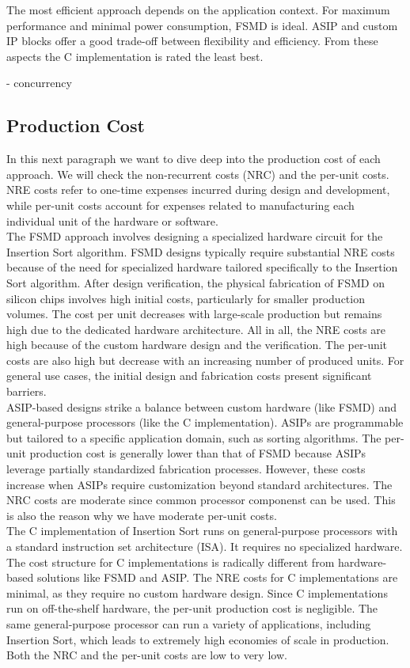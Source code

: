 \documentclass[conference]{IEEEtran}
\begin{document}
The most efficient approach depends on the application context. For maximum performance and minimal power consumption, FSMD is ideal. ASIP and custom IP blocks offer a good trade-off between flexibility and efficiency. From these aspects the C implementation is rated the least best.

- concurrency 


\subsection{Production Cost}
In this next paragraph we want to dive deep into the production cost of each approach. We will check the non-recurrent costs (NRC) and the per-unit costs. NRE costs refer to one-time expenses incurred during design and development, while per-unit costs account for expenses related to manufacturing each individual unit of the hardware or software.\\
The FSMD approach involves designing a specialized hardware circuit for the Insertion Sort algorithm. FSMD designs typically require substantial NRE costs because of the need for specialized
hardware tailored specifically to the Insertion Sort algorithm. After design verification, the physical fabrication of FSMD on silicon chips involves high initial costs, particularly for smaller production volumes. The cost per unit decreases with large-scale production but remains high due to the dedicated hardware architecture. All in all, the NRE costs are high because of the custom hardware design and the verification. The per-unit costs are also high but decrease with an increasing number of produced units. For general use cases, the initial design and fabrication costs present significant barriers.\\
ASIP-based designs strike a balance between custom hardware (like FSMD) and general-purpose processors (like the C implementation). ASIPs are programmable but tailored to a specific application domain, such as sorting algorithms. The per-unit production cost is generally lower than that of FSMD because ASIPs leverage partially standardized fabrication processes. However, these costs increase when ASIPs require customization beyond standard architectures. 
The NRC costs are moderate since common processor componenst can be used. This is also the reason why we have moderate per-unit costs.\\
The C implementation of Insertion Sort runs on general-purpose processors with a standard instruction set architecture (ISA). It requires no specialized hardware. The cost structure for C implementations is radically different from hardware-based solutions like FSMD and ASIP. The NRE costs for C implementations are minimal, as they require no custom hardware design. Since C implementations run on off-the-shelf hardware, the per-unit production cost is negligible. The same general-purpose processor can run a variety of applications, including Insertion Sort, which leads to extremely high economies of scale in production. Both the NRC and the per-unit costs are low to very low. 
\end{document}
